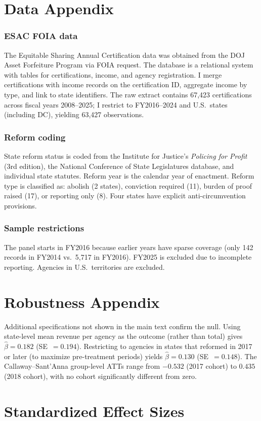 \documentclass[12pt]{article}
\begin{document}
\section{Data Appendix}

\subsubsection*{ESAC FOIA data} The Equitable Sharing Annual Certification data was obtained from the DOJ Asset Forfeiture Program via FOIA request. The database is a relational system with tables for certifications, income, and agency registration. I merge certifications with income records on the certification ID, aggregate income by type, and link to state identifiers. The raw extract contains 67,423 certifications across fiscal years 2008--2025; I restrict to FY2016--2024 and U.S.\ states (including DC), yielding 63,427 observations.

\subsubsection*{Reform coding} State reform status is coded from the Institute for Justice's \textit{Policing for Profit} (3rd edition), the National Conference of State Legislatures database, and individual state statutes. Reform year is the calendar year of enactment. Reform type is classified as: abolish (2 states), conviction required (11), burden of proof raised (17), or reporting only (8). Four states have explicit anti-circumvention provisions.

\subsubsection*{Sample restrictions} The panel starts in FY2016 because earlier years have sparse coverage (only 142 records in FY2014 vs.\ 5,717 in FY2016). FY2025 is excluded due to incomplete reporting. Agencies in U.S.\ territories are excluded.

\section{Robustness Appendix}

Additional specifications not shown in the main text confirm the null. Using state-level mean revenue per agency as the outcome (rather than total) gives $\hat{\beta} = 0.182$ (SE~$= 0.194$). Restricting to agencies in states that reformed in 2017 or later (to maximize pre-treatment periods) yields $\hat{\beta} = 0.130$ (SE~$= 0.148$). The Callaway--Sant'Anna group-level ATTs range from $-0.532$ (2017 cohort) to $0.435$ (2018 cohort), with no cohort significantly different from zero.

\section{Standardized Effect Sizes}
\label{sec:sde}


\end{document}
